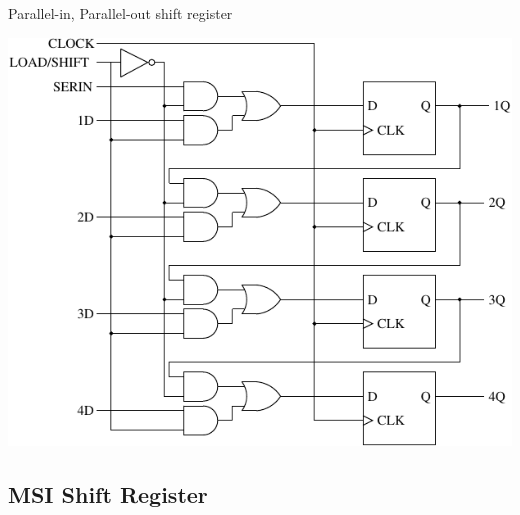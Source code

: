 \begin{frame}{Parallel-in, Parallel-out shift register}
  \begin{center}
    \includegraphics[scale=0.8]{ParallelInParallelOutShiftRegister}
  \end{center}
\end{frame}

\subsection{MSI Shift Register}

